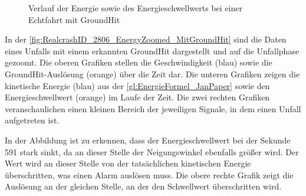\begin{figure}[htpb]
	\centering
	\caption{Verlauf der Energie sowie des Energieschwellwerts bei einer Echtfahrt mit GroundHit}
	\label{fig:RealcrashID_2806_EnergyZoomed_MitGroundHit}
\end{figure}




In der \autoref{fig:RealcrashID_2806_EnergyZoomed_MitGroundHit} sind die Daten eines Unfalls mit einem erkannten GroundHit dargestellt und auf die Unfallphase gezoomt. 
Die oberen Grafiken stellen die Geschwindigkeit (blau) sowie die GroundHit-Auslösung (orange) über die Zeit dar.
Die unteren Grafiken zeigen die kinetische Energie (blau) aus der \autoref{gl:EnergieFormel_JanPaper} sowie den Energieschwellwert (orange) im Laufe der Zeit.
Die zwei rechten Grafiken veranschaulichen einen kleinen Bereich der jeweiligen Signale, in dem einen Unfall aufgetreten ist.

In der Abbildung ist zu erkennen, dass der Energieschwellwert bei der Sekunde 591 stark sinkt, da an dieser Stelle der Neigungswinkel ebenfalls größer wird.
Der Wert wird an dieser Stelle von der tatsächlichen kinetischen Energie überschritten, was einen Alarm auslösen muss. Die obere rechte Grafik zeigt die Auslösung an der gleichen Stelle, an der den Schwellwert überschritten wird.



